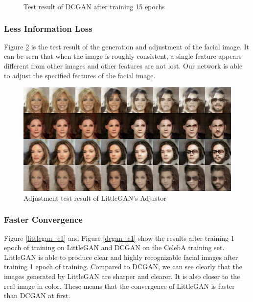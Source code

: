 \begin{figure}
\begin{minipage}[t]{0.48\linewidth}
        \caption{Test result of DCGAN after training 15 epochs}
        \label{dcgan_e15}
    \end{minipage}
\end{figure}


\subsubsection*{Less Information Loss}
Figure \ref{adjust} is the test result of the generation and adjustment of the facial image.
It can be seen that when the image is roughly consistent, a single feature appears different from other images and other features are not lost.
Our network is able to adjust the specified features of the facial image.

\begin{figure}
    \begin{center}
    \includegraphics[width=\textwidth]{figures/result_adjust.png}
    \caption{Adjustment test result of LittleGAN's Adjustor}
    \label{adjust}
    \end{center}
\end{figure}

\subsubsection*{Faster Convergence}
Figure \ref{littlegan_e1} and Figure \ref{dcgan_e1} show the results after training 1 epoch of training on LittleGAN and DCGAN on the CelebA training set.
LittleGAN is able to produce clear and highly recognizable facial images after training 1 epoch of training.
Compared to DCGAN, we can see clearly that the images generated by LittleGAN are sharper and clearer.
It is also closer to the real image in color.
These means that the convergence of LittleGAN is faster than DCGAN at first.

